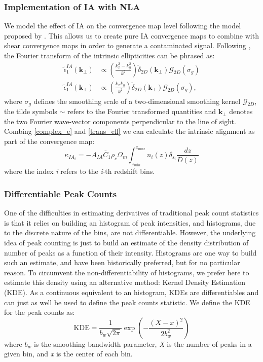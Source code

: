 \documentclass{aa}
\begin{document}
\subsubsection{Implementation of IA with NLA }
We model the effect of IA on the convergence map level following the model proposed by  \citet{fluri2019cosmological}. This allows us to create pure IA convergence maps to combine with shear convergence maps in order to generate a contaminated signal. 
Following \cite{harnois2021cosmic}, the Fourier transform of the intrinsic ellipticities can be phrased as: 
\begin{align}\label{trans_ell}
    \tilde{ \epsilon}_{1}^{IA}(\textbf{k}_{\bot}) & \propto
    \left ( \frac{k_x^2-k_y^2}{k^2} \right )  \tilde{\delta}_{2D}(\textbf{k}_{\bot})
   \mathcal{G}_{2D}(\sigma_g) \\
       \tilde{ \epsilon}_{1}^{IA}(\textbf{k}_{\bot}) & \propto
    \left ( \frac{k_x k_y}{k^2} \right )  \tilde{\delta}_{2D}(\textbf{k}_{\bot})
   \mathcal{G}_{2D}(\sigma_g), \nonumber
\end{align}
where $\sigma_g$ defines the smoothing scale of a two-dimensional smoothing kernel $\mathcal{G}_{2D}$, the tilde symbols $\sim $ refers to the Fourier transformed quantities and $\textbf{k}_{\bot}$ denotes the two Fourier wave-vector components perpendicular to the line of sight.
Combing \autoref{complex_e} and \autoref{trans_ell} we can calculate the intrinsic alignment as part of the convergence map:
\begin{equation}\label{IA_maps}
    \kappa_{IA_{i}}= 
    - A_{IA}\bar{C}_1\rho_c \Omega_m
    \int_{z_{min}}^{z_{max}} 
    n_{i}(z) \delta_{s_{i}}
    \frac{ dz}{D(z)}
\end{equation}
where the index \textit{i} refers to the \textit{i}-th redshift bins.

\subsubsection{Differentiable Peak Counts}
One of the difficulties in estimating derivatives of traditional peak count statistics is that it relies on building
an histogram of peak intensities, and histograms, due to the discrete nature of the bins, are not differentiable. However, the underlying idea of peak counting is just to build an estimate of the density distribution of number of peaks as a function of their intensity. Histograms are one way to build such an estimate, and have been historically preferred, but for no particular reason. To circumvent the non-differentiability of histograms, we prefer here to estimate this density using an alternative method: Kernel Density Estimation (KDE). As a continuous equivalent to an histogram, KDEs are differentiables and can just as well be used to define the peak counts statistic.  
We define the KDE for the peak counts as:
\begin{equation}
   \text{KDE}= \frac{1}{ b_w \sqrt{2\pi}} \exp{\left ( -\frac{(X-x)^2}{2 b_w^2} \right )}
\end{equation}
where $b_w$ is the smoothing bandwidth parameter, \textit{X} is the number of peaks in a given bin, and \textit{x} is the center of each bin.
\end{document}
